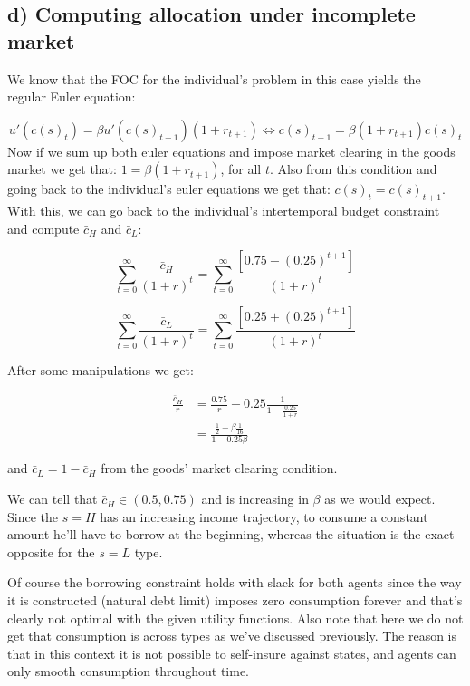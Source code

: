 \documentclass[11pt]{article}
\begin{document}
    \hypertarget{d-computing-allocation-under-incomplete-market}{%
\subsection{d) Computing allocation under incomplete
market}\label{d-computing-allocation-under-incomplete-market}}

We know that the FOC for the individual's problem in this case yields
the regular Euler equation:

\[
u'(c(s)_t)=\beta u'(c(s)_{t+1})(1+r_{t+1}) \Leftrightarrow c(s)_{t+1}=\beta (1+r_{t+1})c(s)_{t}
\] Now if we sum up both euler equations and impose market clearing in
the goods market we get that: \(1=\beta (1+r_{t+1})\), for all \(t\).
Also from this condition and going back to the individual's euler
equations we get that: \(c(s)_t=c(s)_{t+1}\). With this, we can go back
to the individual's intertemporal budget constraint and compute
\(\bar{c}_H\) and \(\bar{c}_L\):

\[
\sum_{t=0}^{\infty} \frac{\bar{c}_H}{(1+r)^t} = \sum_{t=0}^{\infty} \frac{[0.75-(0.25)^{t+1}]}{(1+r)^t}
\]

\[
\sum_{t=0}^{\infty} \frac{\bar{c}_L}{(1+r)^t} = \sum_{t=0}^{\infty} \frac{[0.25+(0.25)^{t+1}]}{(1+r)^t}
\]

After some manipulations we get:

\begin{align*}
\frac{\bar{c}_H}{r}&=\frac{0.75}{r}-0.25\frac{1}{1-\frac{0.25}{1+r}}\\&=\frac{\frac{1}{2}+\beta\frac{1}{16}}{1-0.25\beta}
\end{align*}

and \(\bar{c}_L=1-\bar{c}_H\) from the goods' market clearing condition.

We can tell that \(\bar{c}_H\in(0.5,0.75)\) and is increasing in
\(\beta\) as we would expect. Since the \(s=H\) has an increasing income
trajectory, to consume a constant amount he'll have to borrow at the
beginning, whereas the situation is the exact opposite for the \(s=L\)
type.

Of course the borrowing constraint holds with slack for both agents
since the way it is constructed (natural debt limit) imposes zero
consumption forever and that's clearly not optimal with the given
utility functions. Also note that here we do not get that consumption is
across types as we've discussed previously. The reason is that in this
context it is not possible to self-insure against states, and agents can
only smooth consumption throughout time.
\end{document}
